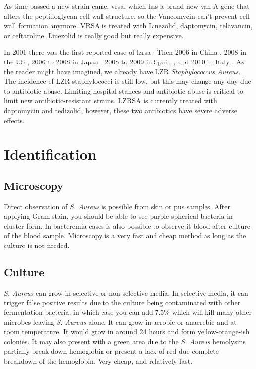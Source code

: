 As time passed a new strain came, \gls{vrsa}, which has a brand new van-A gene that alters the peptidoglycan cell wall structure, so the Vancomycin can't prevent cell wall formation anymore. VRSA is treated with Linezolid, daptomycin, telavancin, or ceftaroline. Linezolid is really good but really expensive.

In 2001 there was the first reported case of \gls{lzrsa} \cite{Tsiodras2001}. Then 2006 in China \cite{Jones2007}, 2008 in the US \cite{Mendes2008}, 2006 to 2008 in Japan \cite{IkedaDantsuji2011}, 2008 to 2009 in Spain \cite{Seral2011}, and 2010 in Italy \cite{Mendes2010}. As the reader might have imagined, we already have LZR \textit{Staphylococcus Aureus}. The incidence of LZR staphylococci is still low, but this may change any day due to antibiotic abuse. Limiting hospital stances and antibiotic abuse is critical to limit new antibiotic-resistant strains. LZRSA is currently treated with daptomycin and tedizolid, however, these two antibiotics have severe adverse effects.

\section{Identification}

\subsection{Microscopy}

Direct observation of \textit{S. Aureus} is possible from skin or pus samples. After applying Gram-stain, you should be able to see purple spherical bacteria in cluster form. In bacteremia cases is also possible to observe it blood after culture of the blood sample. Microscopy is a very fast and cheap method as long as the culture is not needed.

\subsection{Culture}
\label{staph:culture}

\textit{S. Aureus} can grow in selective or non-selective media. In selective media, it can trigger false positive results due to the culture being contaminated with other fermentation bacteria, in which case you can add 7.5\%  which will kill many other microbes leaving \textit{S. Aureus} alone. It can grow in aerobic or anaerobic and at room temperature. It would grow in around 24 hours and form yellow-orange-ish colonies. It may also present with a green area due to the \textit{S. Aureus} hemolysins partially break down hemoglobin or present a lack of red due complete breakdown of the hemoglobin. Very cheap, and relatively fast.

